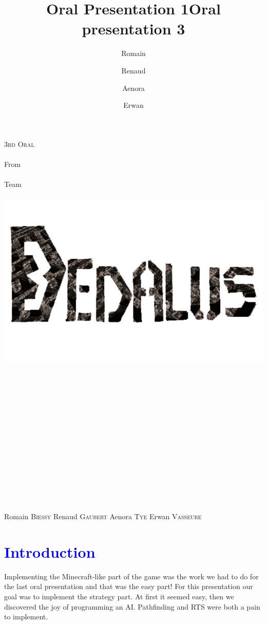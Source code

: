 \documentclass[article]{report}             %
\title {Oral Presentation 1}
\title {Oral presentation 3}
\author {Romain\and Renaud\and Aenora\and Erwan}
\date {}
\begin{document}
	\thispagestyle{empty}
  	\begin{titlepage} 
		\vspace*{1cm} 
  		\begin{center} 
  			{\huge{\textsc{3rd Oral} \\ ~ \\{\large From}\\ ~\\ Team \\  ~ \\ }}
	  		\includegraphics[width = 14cm]{images/Titles/Dedalus.png}
			\\ ~ \\ ~ \\ ~ \\ ~ \\ ~ \\ ~ \\ ~ \\ ~ \\ ~ \\ ~ \\ ~ \\ ~ \\ ~ \\ ~ 
		\end{center}
  		\hfill {\large Romain \textsc{Biessy}}
  		\hfill {\large Renaud \textsc{Gaubert}}
  		\hfill {\large Aenora \textsc{Tye}}
  		\hfill {\large Erwan  \textsc{Vasseure}}
  	\end{titlepage} 

  	\tableofcontents
  		\newpage
		
		\chapter{\textcolor{blue}{Introduction}}
			Implementing the Minecraft-like part of the game was the work we had to do for the last oral presentation and that was the easy part! For this presentation our goal was to implement the strategy part. At first it seemed easy, then we discovered the joy of programming an AI. Pathfinding and RTS were both a pain to implement. \\
\end{document}
